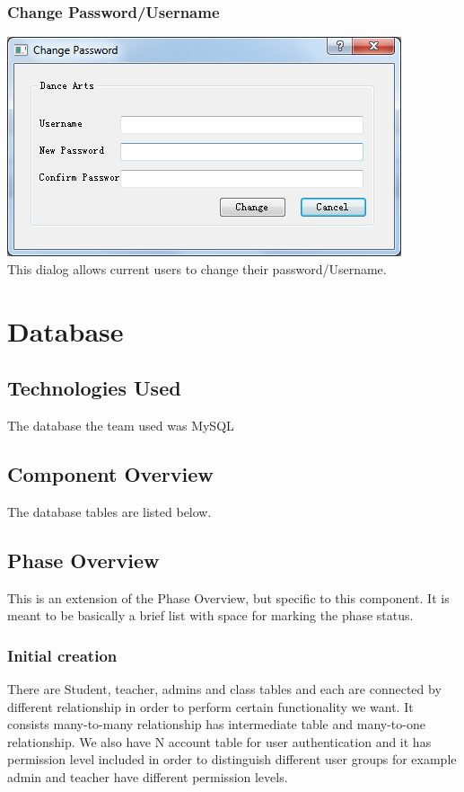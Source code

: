 \subsubsection{Change Password/Username}
\includegraphics[scale=0.5]{pics/change_pass.png}\\
This dialog allows current users to change their password/Username.\\



\section{Database}

\subsection{Technologies  Used}
The database the team used was MySQL

\subsection{Component  Overview}
The database tables are listed below.


\subsection{Phase Overview}
This is an extension of the Phase Overview, but specific to this component. 
It is meant to be basically a brief list with space for marking the phase status.

\subsubsection{Initial creation}
There are Student, teacher, admins and class tables and each are connected by different relationship in order to perform certain functionality we want. It consists many-to-many relationship has intermediate table and many-to-one relationship. We also have N account table for user authentication and it has permission level included in order to distinguish different user groups for example admin and teacher have different permission levels.\\

